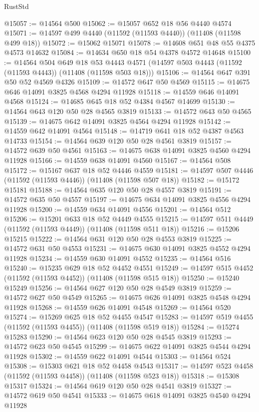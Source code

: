 \begin{lexlean}{RustStd}
\begin{coremodule}
@15057 := @14564 @500
@15062 := @15057 @652 @18 @56 @4440 @4574
@15071 := @14597 @499 @4440 (@11592 (@11593 @4440)) (@11408 (@11598 @499 @18))
@15072 := @15062 @15071
@15078 := @14608 @651 @48 @55 @4375 @4573 @14632
@15084 := @14634 @650 @18 @54 @4378 @4572 @14648
@15100 := @14564
    @504
    @649
    @18
    @53
    @4443
    @4571
    (@14597 @503 @4443 (@11592 (@11593 @4443)) (@11408 (@11598 @503 @18)))
@15106 := @14564 @647 @391 @50 @52 @4569 @4326
@15109 := @14572 @647 @50 @4569
@15115 := @14675 @646 @14091 @3825 @4568 @4294 @11928
@15118 := @14559 @646 @14091 @4568
@15124 := @14685 @645 @18 @52 @4384 @4567 @14699
@15130 := @14564 @643 @120 @50 @28 @4565 @3819
@15133 := @14572 @643 @50 @4565
@15139 := @14675 @642 @14091 @3825 @4564 @4294 @11928
@15142 := @14559 @642 @14091 @4564
@15148 := @14719 @641 @18 @52 @4387 @4563 @14733
@15154 := @14564 @639 @120 @50 @28 @4561 @3819
@15157 := @14572 @639 @50 @4561
@15163 := @14675 @638 @14091 @3825 @4560 @4294 @11928
@15166 := @14559 @638 @14091 @4560
@15167 := @14564 @508
@15172 := @15167 @637 @18 @52 @4446 @4559
@15181 := @14597 @507 @4446 (@11592 (@11593 @4446)) (@11408 (@11598 @507 @18))
@15182 := @15172 @15181
@15188 := @14564 @635 @120 @50 @28 @4557 @3819
@15191 := @14572 @635 @50 @4557
@15197 := @14675 @634 @14091 @3825 @4556 @4294 @11928
@15200 := @14559 @634 @14091 @4556
@15201 := @14564 @512
@15206 := @15201 @633 @18 @52 @4449 @4555
@15215 := @14597 @511 @4449 (@11592 (@11593 @4449)) (@11408 (@11598 @511 @18))
@15216 := @15206 @15215
@15222 := @14564 @631 @120 @50 @28 @4553 @3819
@15225 := @14572 @631 @50 @4553
@15231 := @14675 @630 @14091 @3825 @4552 @4294 @11928
@15234 := @14559 @630 @14091 @4552
@15235 := @14564 @516
@15240 := @15235 @629 @18 @52 @4452 @4551
@15249 := @14597 @515 @4452 (@11592 (@11593 @4452)) (@11408 (@11598 @515 @18))
@15250 := @15240 @15249
@15256 := @14564 @627 @120 @50 @28 @4549 @3819
@15259 := @14572 @627 @50 @4549
@15265 := @14675 @626 @14091 @3825 @4548 @4294 @11928
@15268 := @14559 @626 @14091 @4548
@15269 := @14564 @520
@15274 := @15269 @625 @18 @52 @4455 @4547
@15283 := @14597 @519 @4455 (@11592 (@11593 @4455)) (@11408 (@11598 @519 @18))
@15284 := @15274 @15283
@15290 := @14564 @623 @120 @50 @28 @4545 @3819
@15293 := @14572 @623 @50 @4545
@15299 := @14675 @622 @14091 @3825 @4544 @4294 @11928
@15302 := @14559 @622 @14091 @4544
@15303 := @14564 @524
@15308 := @15303 @621 @18 @52 @4458 @4543
@15317 := @14597 @523 @4458 (@11592 (@11593 @4458)) (@11408 (@11598 @523 @18))
@15318 := @15308 @15317
@15324 := @14564 @619 @120 @50 @28 @4541 @3819
@15327 := @14572 @619 @50 @4541
@15333 := @14675 @618 @14091 @3825 @4540 @4294 @11928

\end{coremodule}
\end{lexlean}
